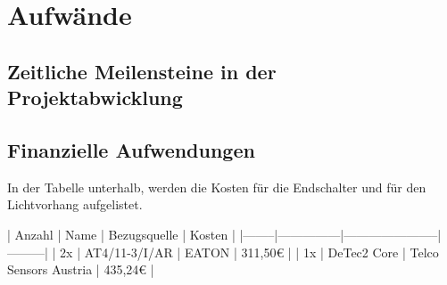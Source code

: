 \section{Aufwände}

\subsection{Zeitliche Meilensteine in der Projektabwicklung}

\begin{HistoryTimeline}[Meilensteine]
\end{HistoryTimeline}

\subsection{Finanzielle Aufwendungen}

In der Tabelle unterhalb, werden die Kosten für die Endschalter und für den Lichtvorhang aufgelistet.

\begin{markdown}

\begin{center}

| Anzahl | Name          | Bezugsquelle          | Kosten  |
|--------|---------------|-----------------------|---------|
| 2x     | AT4/11-3/I/AR | EATON                 | 311,50€ |
| 1x     | DeTec2 Core   | Telco Sensors Austria | 435,24€ |

\end{center}

\end{markdown}
